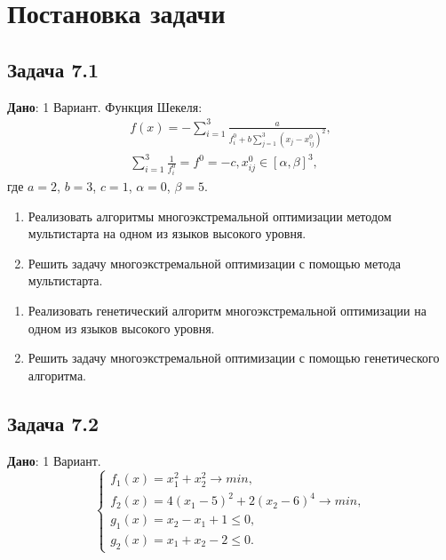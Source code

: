 \documentclass[a4paper, 12pt]{article}   	%
\begin{document}
\newpage

\section{Постановка задачи}
    \subsection{Задача 7.1}
    
    \textbf {Дано}: 1 Вариант. Функция Шекеля:
    \begin{multline}
        f(x) = -\sum_{i=1}^3 \frac{a}{f_i^0 + b \sum_{j=1}^{3} (x_j - x_{ij}^0)^2}, \\ \sum_{i=1}^3 \frac{1}{f_i^0} = f^0 = -c, x_{ij}^0 \in [\alpha, \beta]^3, 
    \end{multline}
    где $a=2$, $b=3$, $c=1$, $\alpha = 0$, $\beta = 5$.

    \begin{enumerate}
        \item Реализовать алгоритмы многоэкстремальной оптимизации методом мультистарта на одном из языков высокого уровня.
        \item Решить задачу многоэкстремальной оптимизации с помощью метода мультистарта. 
    \end{enumerate}
    
    \begin{enumerate}
        \item Реализовать генетический алгоритм многоэкстремальной оптимизации на одном из языков высокого уровня.
        \item Решить задачу многоэкстремальной оптимизации с помощью генетического алгоритма.
    \end{enumerate}
    
\subsection{Задача 7.2}

    \textbf {Дано}: 1 Вариант.
    \begin{equation}
        \begin{cases}
            f_1(x) = x_1^2 + x_2^2 \rightarrow min, \\
            f_2(x) = 4(x_1 - 5)^2 + 2(x_2 - 6)^4 \rightarrow min, \\
            g_1(x) = x_2 - x_1 + 1 \leq 0, \\
            g_2(x) = x_1 + x_2 - 2 \leq 0.
        \end{cases}
    \end{equation}
\end{document}

